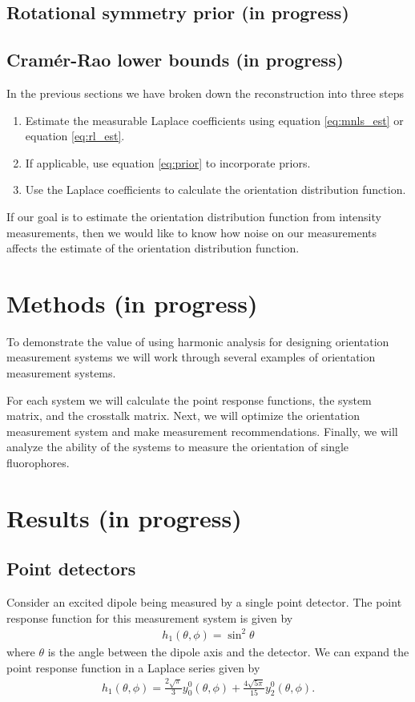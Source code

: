 \documentclass[10pt]{article}
\begin{document}
\subsection{Rotational symmetry prior (in progress)}

\subsection{Cram\'er-Rao lower bounds (in progress)}
In the previous sections we have broken down the reconstruction into three
steps
\begin{enumerate}
\item Estimate the measurable Laplace coefficients using equation
  \ref{eq:mnls_est} or equation \ref{eq:rl_est}.
\item If applicable, use equation \ref{eq:prior} to incorporate priors.
\item Use the Laplace coefficients to calculate the orientation distribution
  function.
\end{enumerate}
If our goal is to estimate the orientation distribution function from intensity
measurements, then we would like to know how noise on our measurements affects
the estimate of the orientation distribution function. 

\section{Methods (in progress)}
To demonstrate the value of using harmonic analysis for designing orientation
measurement systems we will work through several examples of orientation
measurement systems.

For each system we will calculate the point response functions, the system matrix,
and the crosstalk matrix. Next, we will optimize the orientation measurement system
and make measurement recommendations. Finally, we will analyze the ability of
the systems to measure the orientation of single fluorophores.

\section{Results (in progress)}
\subsection{Point detectors}
Consider an excited dipole being measured by a single point detector. The point
response function for this measurement system is given by
\begin{align}
  h_1(\theta, \phi) = \sin^2\theta
\end{align}
where $\theta$ is the angle between the dipole axis and the detector. We can
expand the point response function in a Laplace series given by
\begin{align}
  h_1(\theta, \phi) = \frac{2\sqrt{\pi}}{3}y_0^0(\theta, \phi) + \frac{4\sqrt{5\pi}}{15}y_2^0(\theta, \phi).
\end{align}
\end{document}
